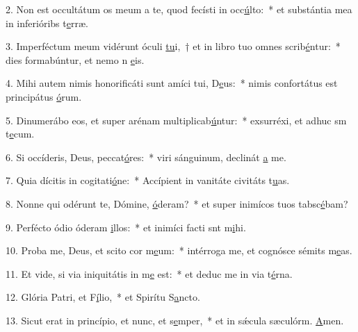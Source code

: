 2. Non est occultátum os meum a te, quod fecísti in occ\uline{ú}lto:~* et substántia mea in inferióribs t\uline{e}rræ.\par 
3. Imperféctum meum vidérunt óculi \uline{tu}i,~† et in libro tuo omnes scrib\uline{é}ntur:~* dies formabúntur, et nemo n \uline{e}is.\par 
4. Mihi autem nimis honorificáti sunt amíci tui, D\uline{e}us:~* nimis confortátus est principátus \uline{ó}rum.\par 
5. Dinumerábo eos, et super arénam multiplicab\uline{ú}ntur:~* exsurréxi, et adhuc sm t\uline{e}cum.\par 
6. Si occíderis, Deus, peccat\uline{ó}res:~* viri sánguinum, declinát \uline{a} me.\par 
7. Quia dícitis in cogitati\uline{ó}ne:~* Accípient in vanitáte civitáts t\uline{u}as.\par 
8. Nonne qui odérunt te, Dómine, \uline{ó}deram?~* et super inimícos tuos tabsc\uline{é}bam?\par 
9. Perfécto ódio óderam \uline{i}llos:~* et inimíci facti snt m\uline{i}hi.\par 
10. Proba me, Deus, et scito cor m\uline{e}um:~* intérroga me, et cognósce sémits m\uline{e}as.\par 
11. Et vide, si via iniquitátis in m\uline{e} est:~* et deduc me in via t\uline{é}rna.\par 
12. Glória Patri, et F\uline{í}lio,~* et Spirítu S\uline{a}ncto.\par 
13. Sicut erat in princípio, et nunc, et s\uline{e}mper,~* et in sǽcula sæculórm. \uline{A}men.\par 
